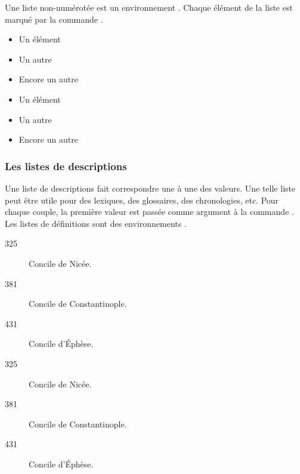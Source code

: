 Une liste non-numérotée est un environnement .
Chaque élément de la liste est marqué par la commande .

\begin{latexcode}
\begin{itemize}
    \item Un élément
    \item Un autre
    \item Encore un autre
\end{itemize}
\end{latexcode}

\begin{quotation*}
\begin{itemize}
    \item Un élément
    \item Un autre
    \item Encore un autre
\end{itemize}
\end{quotation*}

\subsubsection{Les listes de descriptions}

Une liste de descriptions fait correspondre une à une des valeurs. Une telle liste peut être utile pour des lexiques, des glossaires, des chronologies, etc. Pour chaque couple, la première valeur est passée comme argument à la commande . Les listes de définitions sont des environnements .


\begin{latexcode}
\begin{description}
    \item[325]Concile de Nicée.
    \item[381]Concile de Constantinople.
    \item[431]Concile d'Éphèse.
\end{description}
\end{latexcode}

\begin{quotation*}
\begin{description}
    \item[325]Concile de Nicée.
    \item[381]Concile de Constantinople.
    \item[431]Concile d'Éphèse.
\end{description}
\end{quotation*}

